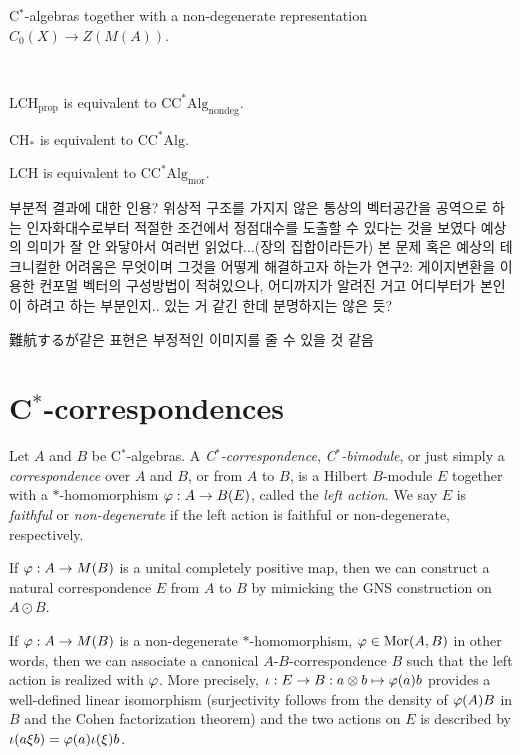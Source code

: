 \documentclass{../../large}
\begin{document}
\begin{prb}
C$^*$-algebras together with a non-degenerate representation $C_0(X)\to Z(M(A))$.
\end{prb}



\begin{prb}
\end{prb}


\begin{prb}
\,
\begin{parts}
\item $\mathrm{LCH}_{\mathrm{prop}}$ is equivalent to $\mathrm{CC^*Alg}_{\mathrm{nondeg}}$.
\item $\mathrm{CH}_*$ is equivalent to $\mathrm{CC^*Alg}$.
\item $\mathrm{LCH}$ is equivalent to $\mathrm{CC^*Alg}_{\mathrm{mor}}$.
\end{parts}
\end{prb}


부분적 결과에 대한 인용?
위상적 구조를 가지지 않은 통상의 벡터공간을 공역으로 하는 인자화대수로부터 적절한 조건에서 정점대수를 도출할 수 있다는 것을 보였다
예상의 의미가 잘 안 와닿아서 여러번 읽었다...(장의 집합이라든가)
본 문제 혹은 예상의 테크니컬한 어려움은 무엇이며 그것을 어떻게 해결하고자 하는가
연구2: 게이지변환을 이용한 컨포멀 벡터의 구성방법이 적혀있으나, 어디까지가 알려진 거고 어디부터가 본인이 하려고 하는 부분인지.. 있는 거 같긴 한데 분명하지는 않은 듯?

難航するが같은 표현은 부정적인 이미지를 줄 수 있을 것 같음


\section{C$^*$-correspondences}


\begin{prb}[C$^*$-correspondences]
Let $A$ and $B$ be C$^*$-algebras.
A \emph{C$^*$-correspondence}, \emph{C$^*$-bimodule}, or just simply a \emph{correspondence} over $A$ and $B$, or from $A$ to $B$, is a Hilbert $B$-module $E$ together with a $*$-homomorphism $\varphi:A\to B(E)$, called the \emph{left action}.
We say $E$ is \emph{faithful} or \emph{non-degenerate} if the left action is faithful or non-degenerate, respectively.
\begin{parts}
\item If $\varphi:A\to M(B)$ is a unital completely positive map, then we can construct a natural correspondence $E$ from $A$ to $B$ by mimicking the GNS construction on $A\odot B$.
\item If $\varphi:A\to M(B)$ is a non-degenerate $*$-homomorphism, $\varphi\in\operatorname{Mor}(A,B)$ in other words, then we can associate a canonical $A$-$B$-correspondence $B$ such that the left action is realized with $\varphi$.
More precisely, $\iota:E\to B:a\otimes b\mapsto\varphi(a)b$ provides a well-defined linear isomorphism (surjectivity follows from the density of $\varphi(A)B$ in $B$ and the Cohen factorization theorem) and the two actions on $E$ is described by $\iota(a\xi b)=\varphi(a)\iota(\xi)b$.
\end{parts}
\end{prb}
\end{document}
